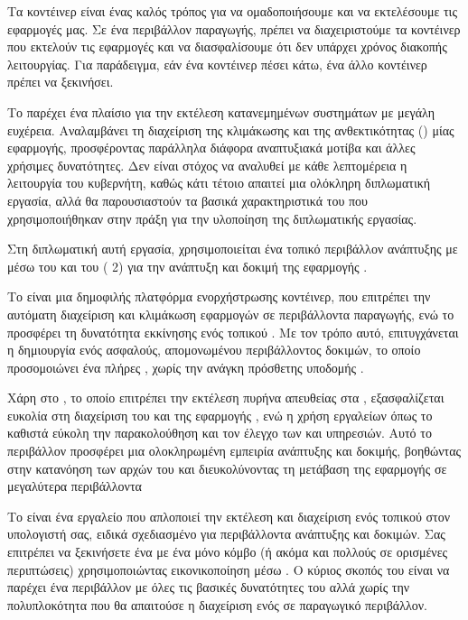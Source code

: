 Τα κοντέινερ είναι ένας καλός τρόπος για να ομαδοποιήσουμε και να εκτελέσουμε τις εφαρμογές μας. 
Σε ένα περιβάλλον παραγωγής, πρέπει να διαχειριστούμε τα κοντέινερ που εκτελούν τις εφαρμογές και να 
διασφαλίσουμε ότι δεν υπάρχει χρόνος διακοπής λειτουργίας. Για παράδειγμα, εάν ένα κοντέινερ πέσει κάτω, ένα άλλο κοντέινερ πρέπει να ξεκινήσει. 

Το  παρέχει ένα πλαίσιο για την εκτέλεση κατανεμημένων συστημάτων με μεγάλη ευχέρεια. Αναλαμβάνει τη διαχείριση της κλιμάκωσης και της ανθεκτικότητας () μίας εφαρμογής, προσφέροντας παράλληλα διάφορα αναπτυξιακά μοτίβα και άλλες χρήσιμες δυνατότητες. Δεν είναι στόχος να αναλυθεί με κάθε λεπτομέρεια η λειτουργία του κυβερνήτη, καθώς κάτι τέτοιο απαιτεί μια ολόκληρη διπλωματική εργασία, αλλά θα παρουσιαστούν τα βασικά χαρακτηριστικά του που χρησιμοποιήθηκαν στην πράξη για την υλοποίηση της διπλωματικής εργασίας.



Στη διπλωματική αυτή εργασία, χρησιμοποιείται ένα τοπικό περιβάλλον 
ανάπτυξης με  μέσω του  και του 
( 2) για την ανάπτυξη και δοκιμή 
της εφαρμογής . 

Το  είναι μια δημοφιλής 
πλατφόρμα ενορχήστρωσης κοντέινερ, που επιτρέπει την αυτόματη 
διαχείριση και κλιμάκωση εφαρμογών σε περιβάλλοντα παραγωγής, 
ενώ το  προσφέρει τη δυνατότητα εκκίνησης ενός 
τοπικού . 
Με τον τρόπο αυτό, επιτυγχάνεται η δημιουργία ενός ασφαλούς, 
απομονωμένου περιβάλλοντος δοκιμών, το οποίο προσομοιώνει ένα 
πλήρες , χωρίς την ανάγκη πρόσθετης υποδομής .

Χάρη στο , το οποίο επιτρέπει την εκτέλεση  
πυρήνα απευθείας στα , 
εξασφαλίζεται ευκολία στη διαχείριση του  
και της εφαρμογής , 
ενώ η χρήση εργαλείων όπως το  
καθιστά εύκολη την παρακολούθηση και τον έλεγχο των  
και υπηρεσιών. Αυτό το περιβάλλον προσφέρει μια ολοκληρωμένη 
εμπειρία ανάπτυξης και δοκιμής, βοηθώντας στην κατανόηση των 
αρχών του  και διευκολύνοντας τη μετάβαση της 
εφαρμογής σε μεγαλύτερα  περιβάλλοντα

Το  είναι ένα εργαλείο που απλοποιεί την εκτέλεση και 
διαχείριση ενός τοπικού  στον υπολογιστή σας,
ειδικά σχεδιασμένο για περιβάλλοντα ανάπτυξης και δοκιμών. 
Σας επιτρέπει να ξεκινήσετε ένα  
με ένα μόνο κόμβο (ή ακόμα και πολλούς σε ορισμένες περιπτώσεις) 
χρησιμοποιώντας εικονικοποίηση μέσω . 
Ο κύριος σκοπός του  είναι να παρέχει ένα περιβάλλον  
με όλες τις βασικές δυνατότητες του  
αλλά χωρίς την πολυπλοκότητα που θα απαιτούσε η διαχείριση ενός 
σε παραγωγικό περιβάλλον.

